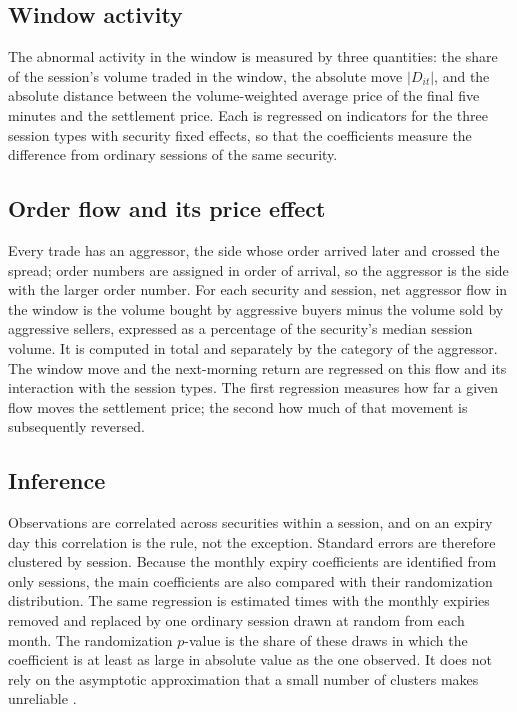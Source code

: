 \subsection{Window activity}

The abnormal activity in the window is measured by three quantities: the share of the
session's volume traded in the window, the absolute move $|D_{it}|$, and the absolute
distance between the volume-weighted average price of the final five minutes and the
settlement price. Each is regressed on indicators for the three session types with security
fixed effects, so that the coefficients measure the difference from ordinary sessions of the
same security.

\subsection{Order flow and its price effect}

Every trade has an aggressor, the side whose order arrived later and crossed the spread;
order numbers are assigned in order of arrival, so the aggressor is the side with the larger
order number. For each security and session, net aggressor flow in the window is the volume
bought by aggressive buyers minus the volume sold by aggressive sellers, expressed as a
percentage of the security's median session volume. It is computed in total and separately
by the category of the aggressor. The window move and the next-morning return are regressed
on this flow and its interaction with the session types. The first regression measures how
far a given flow moves the settlement price; the second how much of that movement is
subsequently reversed.

\subsection{Inference}

Observations are correlated across securities within a session, and on an expiry day this
correlation is the rule, not the exception. Standard errors are therefore clustered by
session. Because the monthly expiry coefficients are identified from only
\TapeNMonthlyexpiry{} sessions, the main coefficients are also compared with their
randomization distribution. The same regression is estimated \RiDraws{} times with the
monthly expiries removed and replaced by one ordinary session drawn at random from each
month. The randomization $p$-value is the share of these draws in which the coefficient is
at least as large in absolute value as the one observed. It does not rely on the asymptotic
approximation that a small number of clusters makes unreliable \citep{cameron2008bootstrap,
young2019channeling}.

